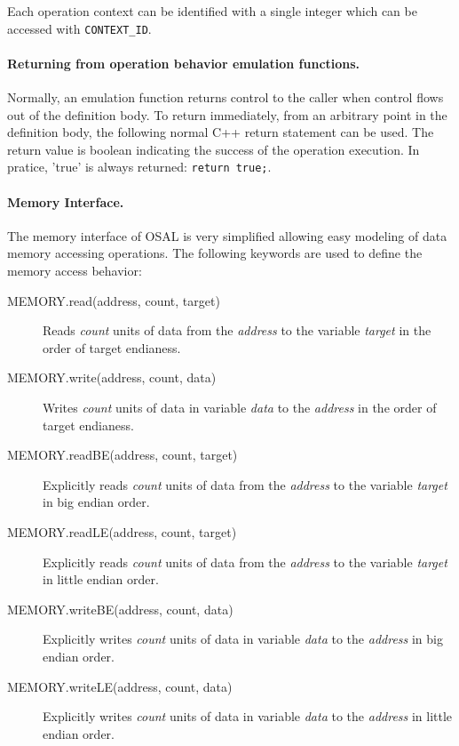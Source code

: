 \documentclass[twoside]{tceusermanual}
\begin{document}
Each operation context can be identified with a single integer which
can be accessed with \verb#CONTEXT_ID#.

\paragraph{Returning from operation behavior emulation functions.}
Normally, an emulation function returns control to the caller when control
flows out of the definition body.  To return immediately, from an arbitrary
point in the definition body, the following normal C++ return 
statement can be used. The return value is boolean indicating the success
of the operation execution. In pratice, 'true' is always returned:
\verb|return true;|.

\paragraph{Memory Interface.}

The memory interface of OSAL is very simplified allowing easy modeling of
data memory accessing operations. The following keywords are used
to define the memory access behavior:

\begin{description}
\item[MEMORY.read(address, count, target)]%
  Reads \emph{count} units of data from the \emph{address} to the variable
  \emph{target} in the order of target endianess.
\item[MEMORY.write(address, count, data)]%
  Writes \emph{count} units of data in variable \emph{data} to
  the \emph{address} in the order of target endianess.
\item[MEMORY.readBE(address, count, target)]%
   Explicitly reads \emph{count} units of data from the \emph{address} to the variable
   \emph{target} in big endian order.
\item[MEMORY.readLE(address, count, target)]%
   Explicitly reads \emph{count} units of data from the \emph{address} to the variable
   \emph{target} in little endian order.
\item[MEMORY.writeBE(address, count, data)]%
  Explicitly writes \emph{count} units of data in variable \emph{data} to
  the \emph{address} in big endian order.
\item[MEMORY.writeLE(address, count, data)]%
  Explicitly writes \emph{count} units of data in variable \emph{data} to
  the \emph{address} in little endian order.
\end{description}
\end{document}

